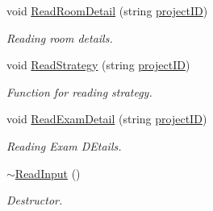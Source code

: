 \begin{DoxyCompactItemize}
void \hyperlink{classReadInput_a7a95590528e5e82277f75285e034eddd}{Read\-Room\-Detail} (string \hyperlink{classReadInput_a3ad470a25b3e0a29466bf4ff1f7d8e81}{project\-I\-D})
\begin{DoxyCompactList}\small\item\em Reading room details. \end{DoxyCompactList}\item 
void \hyperlink{classReadInput_a771826aa24574ac60472560c2c764755}{Read\-Strategy} (string \hyperlink{classReadInput_a3ad470a25b3e0a29466bf4ff1f7d8e81}{project\-I\-D})
\begin{DoxyCompactList}\small\item\em Function for reading strategy. \end{DoxyCompactList}\item 
void \hyperlink{classReadInput_a6e0815acdfaf61b7637a9c9e1c3621d1}{Read\-Exam\-Detail} (string \hyperlink{classReadInput_a3ad470a25b3e0a29466bf4ff1f7d8e81}{project\-I\-D})
\begin{DoxyCompactList}\small\item\em Reading Exam D\-Etails. \end{DoxyCompactList}\item 
\hyperlink{classReadInput_aec19e94e448ed46207c55412a61728fa}{$\sim$\-Read\-Input} ()
\begin{DoxyCompactList}\small\item\em Destructor. \end{DoxyCompactList}\end{DoxyCompactItemize}
